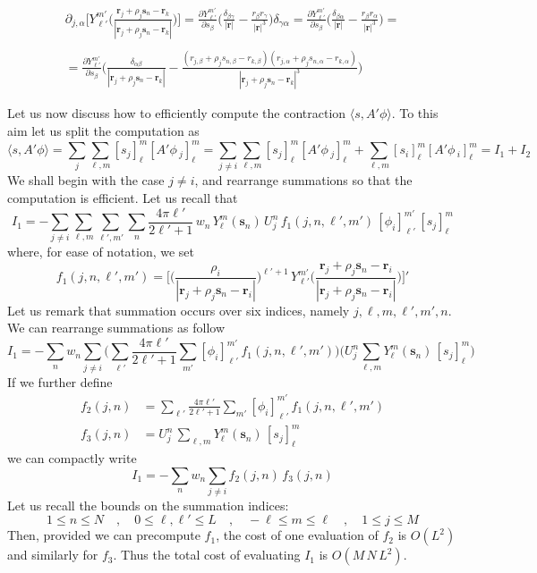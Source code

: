 \documentclass[12pt,letterpaper,oneside]{article}
\theoremstyle{definition}
\begin{document}
\begin{multline*}
\partial_{j,\alpha} \bigg[ Y_{\ell'}^{m'} \bigg( \frac{\boldsymbol{r}_j + \rho_j \boldsymbol{s}_n - \boldsymbol{r}_k}{| \boldsymbol{r}_j + \rho_j \boldsymbol{s}_n - \boldsymbol{r}_k |} \bigg) \bigg] = \frac{\partial Y_{\ell'}^{m'} }{\partial s_\beta} \bigg( \frac{\delta_{\beta \gamma}}{|\boldsymbol{r}|} - \frac{r_\beta r_\gamma}{|\boldsymbol{r}|^3} \bigg)\delta_{\gamma \alpha} = \frac{\partial Y_{\ell'}^{m'} }{\partial s_\beta} \bigg( \frac{\delta_{\beta \alpha}}{|\boldsymbol{r}|} - \frac{r_\beta r_\alpha}{|\boldsymbol{r}|^3} \bigg) = \\ \\
= \frac{\partial Y_{\ell'}^{m'} }{\partial s_\beta} \bigg( \frac{\delta_{\alpha\beta}}{| \boldsymbol{r}_j + \rho_j \boldsymbol{s}_n - \boldsymbol{r}_k |} - \frac{({r}_{j,\beta} + \rho_j {s}_{n,\beta} - {r}_{k,\beta})({r}_{j,\alpha} + \rho_j {s}_{n,\alpha} - {r}_{k,\alpha})}{| \boldsymbol{r}_j + \rho_j \boldsymbol{s}_n - \boldsymbol{r}_k |^3}\bigg)
\end{multline*}

Let us now discuss how to efficiently compute the contraction $\langle s, A' \phi \rangle$. To this aim let us split the computation as
\[
\langle s, A' \phi \rangle  = \sum_j \sum_{\ell,m} [s_j]_\ell^m [A' \phi \,_j]_\ell^m  = \sum_{j \ne i} \sum_{\ell,m} [s_j]_\ell^m [A' \phi \,_j]_\ell^m + \sum_{\ell,m} [s_i]_\ell^m [A' \phi \,_i]_\ell^m = I_1 + I_2
\]
We shall begin with the case $j \ne i$, and rearrange summations so that the computation is efficient. Let us recall that
\[
I_1 = -  \sum_{j \ne i} \sum_{\ell,m} \sum_{\ell',m'} \sum_n  \frac{4 \pi \ell'}{2 \ell'+1} \, w_n \, Y_\ell^m(\boldsymbol{s}_n) \, U_j^n \, f_1(j,n,\ell',m')\, [\phi_i]_{\ell '}^{m '} \, [s_j]_{\ell}^{m}
\]
where, for ease of notation, we set
\[
f_1(j,n,\ell',m') = \bigg[ \bigg( \frac{\rho_i}{| \boldsymbol{r}_j + \rho_j \boldsymbol{s}_n - \boldsymbol{r}_i |} \bigg)^{\ell'+1} \, Y_{\ell'}^{m'} \bigg( \frac{\boldsymbol{r}_j + \rho_j \boldsymbol{s}_n - \boldsymbol{r}_i}{| \boldsymbol{r}_j + \rho_j \boldsymbol{s}_n - \boldsymbol{r}_i |} \bigg) \bigg]'
\]
Let us remark that summation occurs over six indices, namely $j,\ell,m,\ell',m',n$. We can rearrange summations as follow
\[
I_1  =  - \sum_n w_n  \sum_{j \ne i}  \bigg( \sum_{\ell'}  \frac{4 \pi \ell'}{2 \ell'+1} \sum_{m'} [\phi_i]_{\ell '}^{m '} \, f_1(j,n,\ell',m') \bigg) \bigg( U_j^n \sum_{\ell,m}    Y_\ell^m(\boldsymbol{s}_n) \, [s_j]_{\ell}^{m} \bigg)
\]
If we further define
\begin{align*}
f_2(j,n) & = \sum_{\ell'} \frac{4 \pi \ell'}{2 \ell' + 1} \sum_{m'} [\phi_i]_{\ell'}^{m'} \,f_1(j,n,\ell',m') \\
f_3(j,n) & =  U_j^n\, \sum_{\ell,m}    Y_\ell^m(\boldsymbol{s}_n) \, [s_j]_{\ell}^{m}
\end{align*}
we can compactly write
\[
I_1 = - \sum_n w_n  \sum_{j \ne i} f_2(j,n) \, f_3(j,n)
\]
Let us recall the bounds on the summation indices:
\[
1 \le n \le N \quad , \quad 0 \le \ell, \ell' \le L  \quad , \quad -\ell \le m \le \ell \quad ,\quad 1 \le j \le M
\]
Then, provided we can precompute $f_1$, the cost of one evaluation of $f_2$ is $O(L^2)$ and similarly for $f_3$. Thus the total cost of evaluating $I_1$ is $O(M\,N\,L^2)$.
\end{document}
